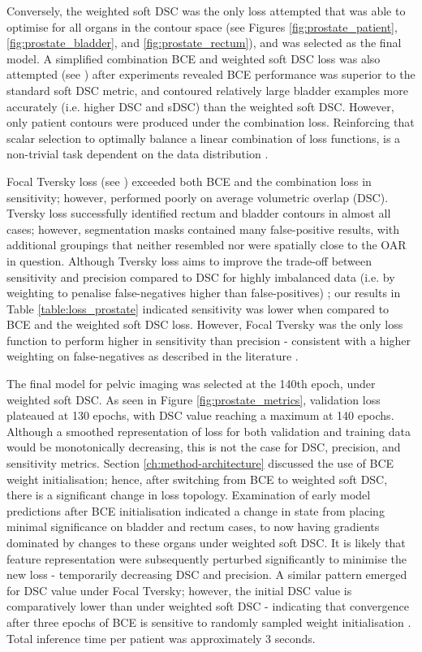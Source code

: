 Conversely, the weighted soft DSC was the only loss attempted that was able to optimise for all organs in the contour space (see Figures \ref{fig:prostate_patient}, \ref{fig:prostate_bladder}, and \ref{fig:prostate_rectum}), and was selected as the final model. A simplified combination BCE and weighted soft DSC loss was also attempted (see \cite{taghanaki2018}) after experiments revealed BCE performance was superior to the standard soft DSC metric, and contoured relatively large bladder examples more accurately (i.e. higher DSC and sDSC) than the weighted soft DSC. However, only patient contours were produced under the combination loss. Reinforcing that scalar selection to optimally balance a linear combination of loss functions, is a non-trivial task dependent on the data distribution \cite{Bertels2019}. 
 
Focal Tversky loss (see \cite{Khan2019}) exceeded both BCE and the combination loss in sensitivity; however, performed poorly on average volumetric overlap (DSC). Tversky loss successfully identified rectum and bladder contours in almost all cases; however, segmentation masks contained many false-positive results, with additional groupings that neither resembled nor were spatially close to the OAR in question. Although Tversky loss aims to improve the trade-off between sensitivity and precision compared to DSC for highly imbalanced data (i.e. by weighting to penalise false-negatives higher than false-positives) \cite{taghanaki2018}; our results in Table \ref{table:loss_prostate} indicated sensitivity was lower when compared to BCE and the weighted soft DSC loss. However, Focal Tversky was the only loss function to perform higher in sensitivity than precision - consistent with a higher weighting on false-negatives as described in the literature \cite{Khan2019}.



The final model for pelvic imaging was selected at the 140th epoch, under weighted soft DSC. As seen in Figure \ref{fig:prostate_metrics}, validation loss plateaued at 130 epochs, with DSC value reaching a maximum at 140 epochs. Although a smoothed representation of loss for both validation and training data would be monotonically decreasing, this is not the case for DSC, precision, and sensitivity metrics. Section \ref{ch:method-architecture} discussed the use of BCE weight initialisation; hence, after switching from BCE to weighted soft DSC, there is a significant change in loss topology. Examination of early model predictions after BCE initialisation indicated a change in state from placing minimal significance on bladder and rectum cases, to now having gradients dominated by changes to these organs under weighted soft DSC. It is likely that feature representation were subsequently perturbed significantly to minimise the new loss - temporarily decreasing DSC and precision. A similar pattern emerged for DSC value under Focal Tversky; however, the initial DSC value is comparatively lower than under weighted soft DSC - indicating that convergence after three epochs of BCE is sensitive to randomly sampled weight initialisation \cite{Ronneberger_2015}. Total inference time per patient was approximately 3 seconds.

